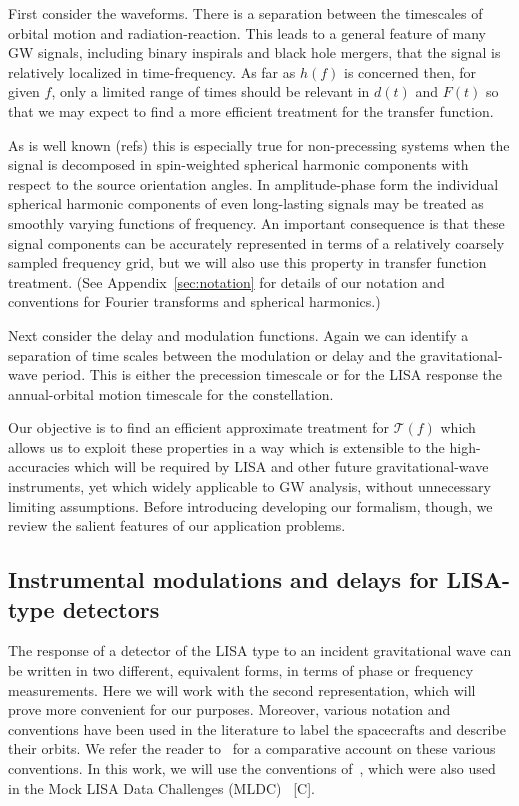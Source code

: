 \documentclass[aps,showpacs,twocolumn,
prd,superscriptaddress,nofootinbib]{revtex4-1}
\newcommand\calT{{\mathcal{T}}}
\newcommand{\SM}[1]{{\color{Red} #1}}
\newcommand{\jgb}[1]{{\color{DarkGreen} #1}}
\begin{document}
\jgb{First consider the waveforms. There is a separation between the timescales of orbital motion and radiation-reaction. This leads to a general feature of many GW signals, including binary inspirals and black hole mergers, that the signal is relatively localized in time-frequency.  As far as $h(f)$ is concerned then, for given $f$, only a limited range of times should be relevant in $d(t)$ and $F(t)$ so that we may expect to find a more efficient treatment for the transfer function.}

\jgb{As is well known (refs) this is especially true for non-precessing systems when the signal is decomposed in spin-weighted spherical harmonic components with respect to the source orientation angles.  In amplitude-phase form the individual spherical harmonic components of even long-lasting signals may be treated as smoothly varying functions of frequency.  An important consequence is that these signal components can be accurately represented in terms of a relatively coarsely sampled frequency grid, but we will also use this property in transfer function treatment.  (See Appendix~\ref{sec:notation} for details of our notation and conventions for Fourier transforms and spherical harmonics.)}

\jgb{Next consider the delay and modulation functions.  Again we can identify a separation of time scales between the modulation or delay and the gravitational-wave period. This is either the precession timescale or for the LISA response the annual-orbital motion timescale for the constellation.}

\jgb{Our objective is to find an efficient approximate treatment for $\calT(f)$ which allows us to exploit these properties in a way which is extensible to the high-accuracies which will be required by LISA and other future gravitational-wave instruments, yet which widely applicable to GW analysis, without unnecessary limiting assumptions. Before introducing developing our formalism, though, we review the salient features of our application problems.}

\subsection{Instrumental modulations and delays for LISA-type detectors}
\label{subsec:modulationLISA}

The response of a detector of the LISA type to an incident gravitational wave can be written in two different, equivalent forms, in terms of phase or frequency measurements. Here we will work with the second representation, which will prove more convenient for our purposes. Moreover, various notation and conventions have been used in the literature to label the spacecrafts and describe their orbits. We refer the reader to~\cite{Vallisneri04} for a comparative account on these various conventions. In this work, we will use the conventions of~\cite{Vallisneri04}, which were also used in the Mock LISA Data Challenges (MLDC)~\cite{} \SM{[C]}.
\end{document}
